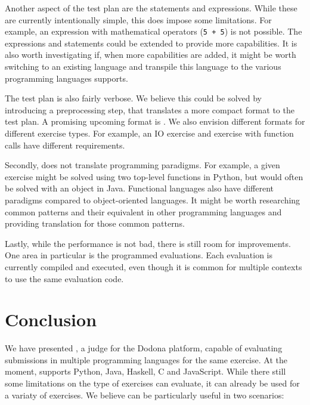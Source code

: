 \documentclass[5p,number]{elsarticle}
\begin{document}
    Another aspect of the test plan are the statements and expressions.
    While these are currently intentionally simple, this does impose some limitations.
    For example, an expression with mathematical operators (\texttt{5 + 5}) is not possible.
    The expressions and statements could be extended to provide more capabilities.
    It is also worth investigating if, when more capabilities are added, it might be worth switching to an existing language and transpile this language to the various programming languages \tested{} supports.
    
    The test plan is also fairly verbose.
    We believe this could be solved by introducing a preprocessing step, that translates a more compact format to the test plan.
    A promising upcoming format is \cite{peml}.
    We also envision different formats for different exercise types.
    For example, an IO exercise and exercise with function calls have different requirements.
    
    Secondly, \tested{} does not translate programming paradigms.
    For example, a given exercise might be solved using two top-level functions in Python, but would often be solved with an object in Java.
    Functional languages also have different paradigms compared to object-oriented languages.
    It might be worth researching common patterns and their equivalent in other programming languages and providing translation for those common patterns.
    
    Lastly, while the performance is not bad, there is still room for improvements.
    One area in particular is the programmed evaluations.
    Each evaluation is currently compiled and executed, even though it is common for multiple contexts to use the same evaluation code.
    
    \section{Conclusion}\label{sec:conclusion}
    
    We have presented \tested{}, a judge for the Dodona platform, capable of evaluating submissions in multiple programming languages for the same exercise.
    At the moment, \tested{} supports Python, Java, Haskell, C and JavaScript.
    While there still some limitations on the type of exercises \tested{} can evaluate, it can already be used for a variaty of exercises.
    We believe \tested{} can be particularly useful in two scenarios:
    
\end{document}
